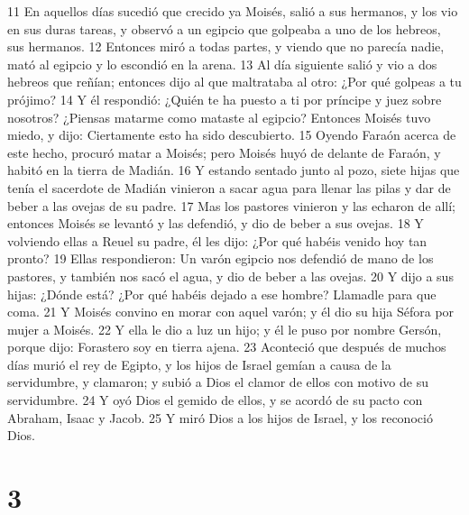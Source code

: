 11 En aquellos días sucedió que crecido ya Moisés, salió a sus hermanos, y los vio en sus duras tareas, y observó a un egipcio que golpeaba a uno de los hebreos, sus hermanos.
12 Entonces miró a todas partes, y viendo que no parecía nadie, mató al egipcio y lo escondió en la arena.
13 Al día siguiente salió y vio a dos hebreos que reñían; entonces dijo al que maltrataba al otro: ¿Por qué golpeas a tu prójimo?
14 Y él respondió: ¿Quién te ha puesto a ti por príncipe y juez sobre nosotros? ¿Piensas matarme como mataste al egipcio? Entonces Moisés tuvo miedo, y dijo: Ciertamente esto ha sido descubierto.
15 Oyendo Faraón acerca de este hecho, procuró matar a Moisés; pero Moisés huyó de delante de Faraón, y habitó en la tierra de Madián.
16 Y estando sentado junto al pozo, siete hijas que tenía el sacerdote de Madián vinieron a sacar agua para llenar las pilas y dar de beber a las ovejas de su padre.
17 Mas los pastores vinieron y las echaron de allí; entonces Moisés se levantó y las defendió, y dio de beber a sus ovejas.
18 Y volviendo ellas a Reuel su padre, él les dijo: ¿Por qué habéis venido hoy tan pronto?
19 Ellas respondieron: Un varón egipcio nos defendió de mano de los pastores, y también nos sacó el agua, y dio de beber a las ovejas.
20 Y dijo a sus hijas: ¿Dónde está? ¿Por qué habéis dejado a ese hombre? Llamadle para que coma.
21 Y Moisés convino en morar con aquel varón; y él dio su hija Séfora por mujer a Moisés.
22 Y ella le dio a luz un hijo; y él le puso por nombre Gersón, porque dijo: Forastero soy en tierra ajena.
23 Aconteció que después de muchos días murió el rey de Egipto, y los hijos de Israel gemían a causa de la servidumbre, y clamaron; y subió a Dios el clamor de ellos con motivo de su servidumbre.
24 Y oyó Dios el gemido de ellos, y se acordó de su pacto con Abraham, Isaac y Jacob.
25 Y miró Dios a los hijos de Israel, y los reconoció Dios.

\chapter{3}

